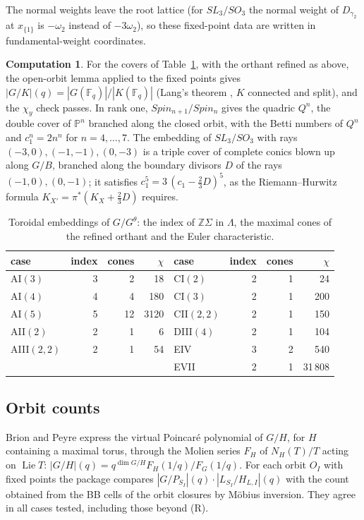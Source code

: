 \documentclass[11pt]{amsart}
\theoremstyle{definition}
\newtheorem{computation}[theorem]{Computation}
\theoremstyle{remark}
\newcommand{\PP}{\mathbb{P}}
\newcommand{\ZZ}{\mathbb{Z}}
\begin{document}
The normal weights leave the root lattice (for $SL_3/SO_3$ the normal weight
of $D_{\gamma_2}$ at $x_{\{1\}}$ is $-\omega_2$ instead of $-3\omega_2$), so
these fixed-point data are written in fundamental-weight coordinates.

\begin{computation}\label{comp:covers}
For the covers of Table~\ref{tab:covers}, with the orthant refined as above,
the open-orbit lemma applied to the fixed points gives
$|G/K|(q)=|G(\mathbb F_q)|/|K(\mathbb F_q)|$ (Lang's theorem \cite{Lang},
$K$ connected and split), and the $\chi_y$ check passes. In rank one,
$Spin_{n+1}/Spin_n$ gives the quadric $Q^n$, the double cover of $\PP^n$
branched along the closed orbit, with the Betti numbers of $Q^n$ and
$c_1^n=2n^n$ for $n=4,\dots,7$. The embedding of $SL_3/SO_3$ with rays
$(-3,0),(-1,-1),(0,-3)$ is a triple cover of complete conics blown up along
$G/B$, branched along the boundary divisors $D$ of the rays $(-1,0),(0,-1)$;
it satisfies $c_1^5=3\,(c_1-\tfrac23 D)^5$, as the Riemann--Hurwitz
formula $K_{X'}=\pi^*(K_X+\tfrac23 D)$ requires.
\end{computation}

\begin{table}[ht]
\caption{Toroidal embeddings of $G/G^\theta$: the index of $\ZZ\Sigma$ in
$\Lambda$, the maximal cones of the refined orthant and the Euler
characteristic.}\label{tab:covers}
\begin{tabular}{lrrr@{\qquad}lrrr}
\toprule
case & index & cones & $\chi$ & case & index & cones & $\chi$ \\
\midrule
AI$(3)$ & 3 & 2 & 18 & CI$(2)$ & 2 & 1 & 24 \\
AI$(4)$ & 4 & 4 & 180 & CI$(3)$ & 2 & 1 & 200 \\
AI$(5)$ & 5 & 12 & 3120 & CII$(2,2)$ & 2 & 1 & 150 \\
AII$(2)$ & 2 & 1 & 6 & DIII$(4)$ & 2 & 1 & 104 \\
AIII$(2,2)$ & 2 & 1 & 54 & EIV & 3 & 2 & 540 \\
 & & & & EVII & 2 & 1 & 31\,808 \\
\bottomrule
\end{tabular}
\end{table}

\subsection{Orbit counts}\label{subsec:orbitcounts}
Brion and Peyre \cite{BrionPeyre} express the virtual Poincar\'e polynomial
of $G/H$, for $H$ containing a maximal torus, through the Molien series
$F_H$ of $N_H(T)/T$ acting on $\operatorname{Lie}T$:
$|G/H|(q) = q^{\dim G/H}F_H(1/q)/F_G(1/q)$. For each orbit $O_I$ with fixed
points the package compares $|G/P_{S_I}|(q)\cdot|L_{S_I}/H_{L,I}|(q)$ with the
count obtained from the BB cells of the orbit closures by M\"obius
inversion. They agree in all cases tested, including those beyond (R).
\end{document}
